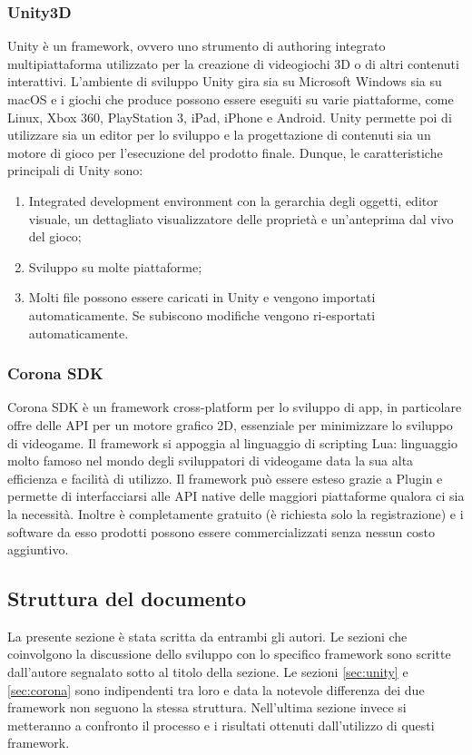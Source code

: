 		\subsubsection{Unity3D}
			Unity è un framework, ovvero uno strumento di authoring integrato multipiattaforma utilizzato per la creazione di videogiochi 3D o di altri contenuti interattivi. 
			L'ambiente di sviluppo Unity gira sia su Microsoft Windows sia su macOS e i giochi che produce possono essere eseguiti su varie piattaforme, come Linux, Xbox 360, PlayStation 3, iPad, iPhone e Android. 
			Unity permette poi di utilizzare sia un editor per lo sviluppo e la progettazione di contenuti sia un motore di gioco per l'esecuzione del prodotto finale. 
			Dunque, le caratteristiche principali di Unity sono:
			\begin{enumerate}
				\item Integrated development environment con la gerarchia degli oggetti, editor visuale, un dettagliato visualizzatore delle proprietà e un'anteprima dal vivo del gioco;
				\item Sviluppo su molte piattaforme;
				\item Molti file possono essere caricati in Unity e vengono importati automaticamente. Se subiscono modifiche vengono ri-esportati automaticamente.
			\end{enumerate}
		
		\subsubsection{Corona SDK}
			Corona SDK è un framework cross-platform per lo sviluppo di app, in particolare offre delle API per un motore grafico 2D, essenziale per minimizzare lo sviluppo di videogame. Il framework si appoggia al linguaggio di scripting Lua: linguaggio molto famoso nel mondo degli sviluppatori di videogame data la sua alta efficienza e facilità di utilizzo. Il framework può essere esteso grazie a Plugin e permette di interfacciarsi alle API native delle maggiori piattaforme qualora ci sia la necessità. Inoltre è completamente gratuito (è richiesta solo la registrazione) e i software da esso prodotti possono essere commercializzati senza nessun costo aggiuntivo.
		
		
	\subsection{Struttura del documento}
		La presente sezione è stata scritta da entrambi gli autori. Le sezioni che coinvolgono la discussione dello sviluppo con lo specifico framework sono scritte dall'autore segnalato sotto al titolo della sezione. Le sezioni \ref{sec:unity} e \ref{sec:corona} sono indipendenti tra loro e data la notevole differenza dei due framework non seguono la stessa struttura. Nell'ultima sezione invece si metteranno a confronto il processo e i risultati ottenuti dall'utilizzo di questi framework.
	
	